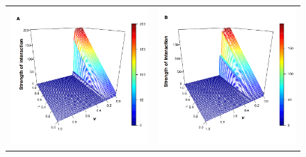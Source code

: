 \documentclass[11pt]{article}
\begin{document}
\FloatBarrier


\begin{figure} [h!]
\centering
\begin{tabular}{cc}

\includegraphics[scale=0.28]{images/erdos_trust_nus_1.png} & \includegraphics[scale=0.28]{images/watts_trust_nus_1.png} \\

\end{tabular}
\end{figure}
\end{document}
